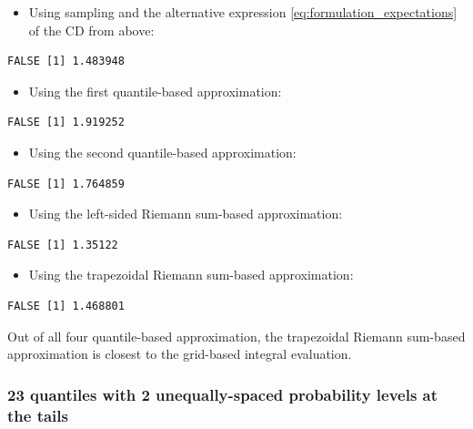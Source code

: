 \documentclass[
]{article}
\providecommand{\tightlist}{%
  \setlength{\itemsep}{0pt}\setlength{\parskip}{0pt}}
\begin{document}
\begin{itemize}
\tightlist
\item
  Using sampling and the alternative expression
  \eqref{eq:formulation_expectations} of the CD from above:
\end{itemize}

\begin{verbatim}
FALSE [1] 1.483948
\end{verbatim}

\begin{itemize}
\tightlist
\item
  Using the first quantile-based approximation:
\end{itemize}

\begin{verbatim}
FALSE [1] 1.919252
\end{verbatim}

\begin{itemize}
\tightlist
\item
  Using the second quantile-based approximation:
\end{itemize}

\begin{verbatim}
FALSE [1] 1.764859
\end{verbatim}

\begin{itemize}
\tightlist
\item
  Using the left-sided Riemann sum-based approximation:
\end{itemize}

\begin{verbatim}
FALSE [1] 1.35122
\end{verbatim}

\begin{itemize}
\tightlist
\item
  Using the trapezoidal Riemann sum-based approximation:
\end{itemize}

\begin{verbatim}
FALSE [1] 1.468801
\end{verbatim}

Out of all four quantile-based approximation, the trapezoidal Riemann
sum-based approximation is closest to the grid-based integral
evaluation.

\hypertarget{quantiles-with-2-unequally-spaced-probability-levels-at-the-tails}{%
\subsubsection{23 quantiles with 2 unequally-spaced probability levels
at the
tails}\label{quantiles-with-2-unequally-spaced-probability-levels-at-the-tails}}
\end{document}
